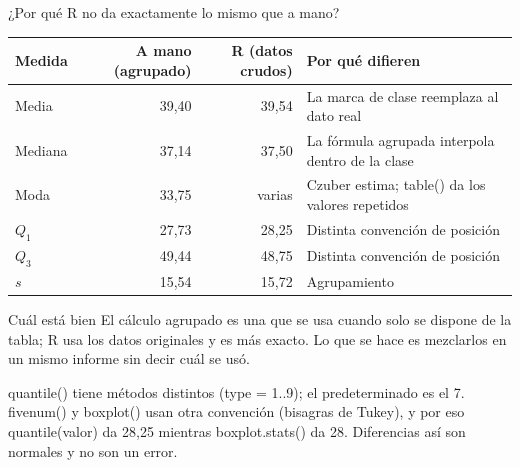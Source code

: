 \documentclass[aspectratio=169,10pt]{beamer}
\newcommand{\fx}[1]{{\ttfamily\color{uniAzul}#1}}
\begin{document}
\begin{frame}{¿Por qué R no da exactamente lo mismo que a mano?}
  \tiny
  \begin{center}
  \begin{tabular}{@{}lrrl@{}}
    \toprule
    \textbf{Medida} & \textbf{A mano (agrupado)} & \textbf{R (datos crudos)} &
    \textbf{Por qué difieren} \\
    \midrule
    Media    & 39{,}40 & 39{,}54 & La marca de clase reemplaza al dato real \\
    Mediana  & 37{,}14 & 37{,}50 & La fórmula agrupada interpola dentro de la clase \\
    Moda     & 33{,}75 & varias & Czuber estima; \fx{table()} da los valores repetidos \\
    $Q_1$    & 27{,}73 & 28{,}25 & Distinta convención de posición \\
    $Q_3$    & 49{,}44 & 48{,}75 & Distinta convención de posición \\
    $s$      & 15{,}54 & 15{,}72 & Agrupamiento \\
    \bottomrule
  \end{tabular}
  \end{center}

  \vspace{0.1cm}
  \begin{alertblock}{Cuál está bien}
    \scriptsize
     El cálculo agrupado es una  que se
    usa cuando solo se dispone de la tabla; R usa los datos originales y es más
    exacto. Lo que  se hace es mezclarlos en un mismo informe
    sin decir cuál se usó.
  \end{alertblock}

  \vspace{0.05cm}
  {\tiny\color{uniGris} \fx{quantile()} tiene  métodos distintos
  (\fx{type = 1..9}); el predeterminado es el 7. \fx{fivenum()} y
  \fx{boxplot()} usan otra convención (bisagras de Tukey), y por eso
  \fx{quantile(valor)} da 28,25 mientras \fx{boxplot.stats()} da 28.
  Diferencias así son normales y no son un error.}
\end{frame}
\end{document}
